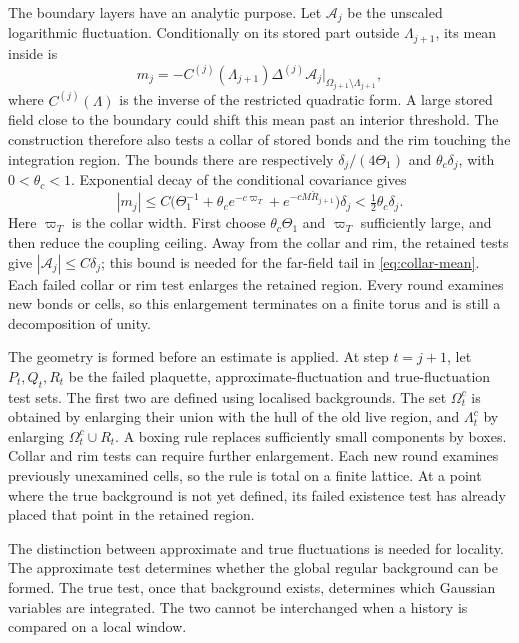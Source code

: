 \documentclass[11pt,letterpaper,reqno]{amsart}
\theoremstyle{definition}
\theoremstyle{remark}
\begin{document}
The boundary layers have an analytic purpose. Let $\mathcal A_j$ be
the unscaled logarithmic fluctuation. Conditionally on its stored
part outside $\Lambda_{j+1}$, its mean inside is
\begin{equation}\label{eq:conditional-mean}
 m_j=-C^{(j)}(\Lambda_{j+1})\Delta^{(j)}
                  \mathcal A_j|_{\Omega_{j+1}\setminus\Lambda_{j+1}},
\end{equation}
where $C^{(j)}(\Lambda)$ is the inverse of the restricted quadratic
form. A large stored field close to the boundary could shift this mean
past an interior threshold. The construction therefore also tests a
collar of stored bonds and the rim touching the integration region.
The bounds there are respectively
$\delta_j/(4\Theta_1)$ and $\theta_c\delta_j$, with
$0<\theta_c<1$. Exponential decay of the conditional covariance gives
\begin{equation}\label{eq:collar-mean}
 |m_j|\le
 C\big(\Theta_1^{-1}+\theta_ce^{-c\varpi_T}
                  +e^{-cM\check R_{j+1}}\big)\delta_j
 <\tfrac12\theta_c\delta_j.
\end{equation}
Here $\varpi_T$ is the collar width. First choose
$\theta_c\Theta_1$ and $\varpi_T$ sufficiently large, and then reduce
the coupling ceiling. Away from the collar and rim, the retained
tests give $|\mathcal A_j|\le C\delta_j$; this bound is needed for
the far-field tail in \eqref{eq:collar-mean}.
Each failed collar or rim test enlarges the
retained region. Every round examines new bonds or cells, so this
enlargement terminates on a finite torus and is still a decomposition
of unity.

The geometry is formed before an estimate is applied. At step
$t=j+1$, let $P_t,Q_t,R_t$ be the failed plaquette,
approximate-fluctuation and true-fluctuation test sets.
The first two are defined using localised backgrounds.
The set $\Omega_t^c$ is obtained by enlarging their union
with the hull of the old live region, and $\Lambda_t^c$
by enlarging $\Omega_t^c\cup R_t$. A boxing rule replaces
sufficiently small components by boxes. Collar and rim
tests can require further enlargement. Each new round
examines previously unexamined cells, so the rule is total
on a finite lattice. At a point where the true background
is not yet defined, its failed existence test has already
placed that point in the retained region.

The distinction between approximate and true fluctuations
is needed for locality. The approximate test determines
whether the global regular background can be formed.
The true test, once that background exists, determines
which Gaussian variables are integrated. The two cannot
be interchanged when a history is compared on a local
window.
\end{document}
